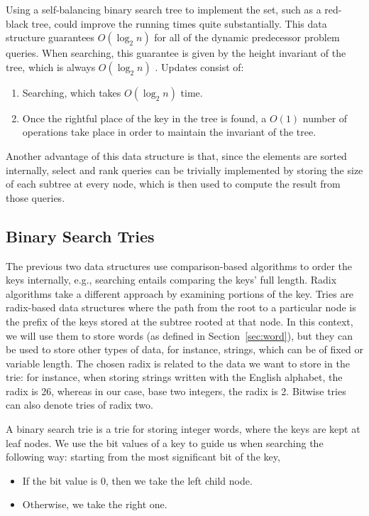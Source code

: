 Using a self-balancing binary search tree to implement the set, such as a red-black tree, could improve the running times quite substantially.
This data structure guarantees $O(\log_2 n)$ for all of the dynamic predecessor problem queries.
When searching, this guarantee is given by the height invariant of the tree, which is always $O(\log_2 n)$ \cite{cormen2009introduction}.
Updates consist of:
\begin{enumerate}
    \item
    Searching, which takes $O(\log_2 n)$ time.
    
    \item
    Once the rightful place of the key in the tree is found, a $O(1)$ number of operations take place in order to maintain the invariant of the tree. 
\end{enumerate}

Another advantage of this data structure is that, since the elements are sorted internally, select and rank queries can be trivially implemented by storing the size of each subtree at every node, which is then used to compute the result from those queries.

\subsection{Binary Search Tries}

The previous two data structures use comparison-based algorithms to order the keys internally, e.g., searching entails comparing the keys' full length.
Radix algorithms take a different approach by examining portions of the key.
Tries are radix-based data structures where the path from the root to a particular node is the prefix of the keys stored at the subtree rooted at that node.
In this context, we will use them to store words (as defined in Section~\ref{sec:word}), but they can be used to store other types of data, for instance, strings, which can be of fixed or variable length.
The chosen radix is related to the data we want to store in the trie: for instance, when storing strings written with the English alphabet, the radix is 26, whereas in our case, base two integers, the radix is 2. Bitwise tries can also denote tries of radix two.

A binary search trie is a trie for storing integer words, where the keys are kept at leaf nodes. We use the bit values of a key to guide us when searching the following way: starting from the most significant bit of the key,
\begin{itemize}
    \item
    If the bit value is $0$, then we take the left child node.
    \item 
    Otherwise, we take the right one.
\end{itemize}

